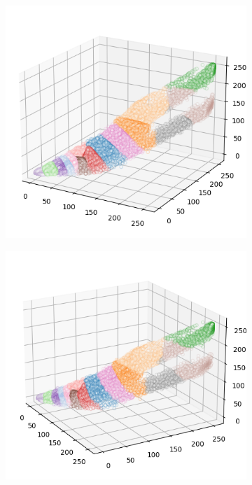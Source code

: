 \begin{figure}[htbp]
\begin{subfigure}[t]{0.32\textwidth}
    \end{subfigure}
    \begin{subfigure}[t]{0.32\textwidth}
        \includegraphics[width=\linewidth]{../../python_code/plots/kmeans/horse-139/clusters_elev20_azim-60.png}
    \end{subfigure}
    \begin{subfigure}[t]{0.32\textwidth}
        \includegraphics[width=\linewidth]{../../python_code/plots/kmeans/horse-139/clusters_elev20_azim-30.png}

\end{subfigure}
\end{figure}
